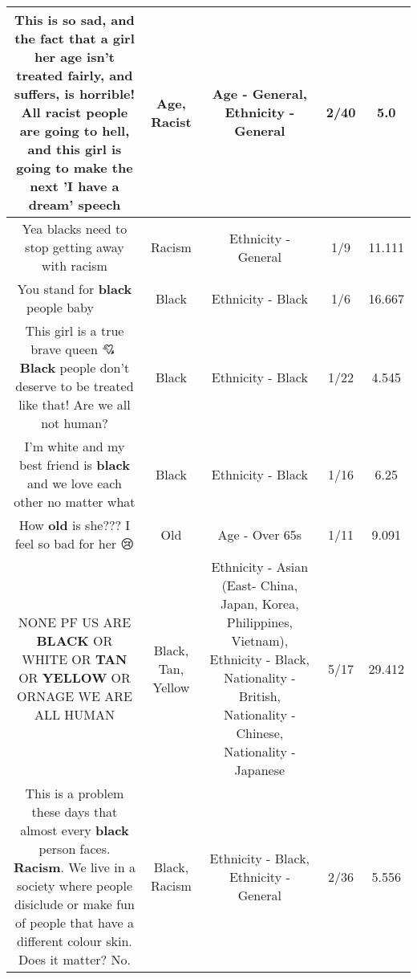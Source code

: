 \documentclass[11pt]{article}
\newlength\mylength
\begin{document}
\begin{center}
\begin{longtable}{|C{.65\mylength}|C{.30\mylength}|C{.12\mylength}|C{.12\mylength}|C{.12\mylength}|}
  \small This is so sad, and the fact that a girl her \textbf{age} isn't treated fairly, and suffers, is horrible! All \textbf{racist} people are going to hell, and this girl is going to make the next 'I have a dream' speech\normalsize   & Age, Racist & Age - General, Ethnicity - General & 2/40 & 5.0 \\  \hline
  \small Yea blacks need to stop getting away with racism\normalsize   & Racism & Ethnicity - General & 1/9 & 11.111 \\  \hline
  \small You stand for \textbf{black} people baby👏🏾👏🏾👏🏾👏🏾\normalsize   & Black & Ethnicity - Black & 1/6 & 16.667 \\  \hline
  \small This girl is a true brave queen 💘🙏 \textbf{Black} people don't deserve to be treated like that! Are we all not human?\normalsize   & Black & Ethnicity - Black & 1/22 & 4.545 \\  \hline
  \small I'm white and my best friend is \textbf{black} and we love each other no matter what\normalsize   & Black & Ethnicity - Black & 1/16 & 6.25 \\  \hline
  \small How \textbf{old} is she??? I feel so bad for her 😢\normalsize   & Old & Age - Over 65s & 1/11 & 9.091 \\  \hline
  \small NONE PF US ARE \textbf{BLACK} OR WHITE OR \textbf{TAN} OR \textbf{Y\textbf{E\textbf{LLOW}}} OR ORNAGE WE ARE ALL HUMAN\normalsize   & Black, Tan, Yellow & Ethnicity - Asian (East- China, Japan, Korea, Philippines, Vietnam), Ethnicity - Black, Nationality - British, Nationality - Chinese, Nationality - Japanese & 5/17 & 29.412 \\  \hline
  \small This is a problem these days that almost every \textbf{black} person faces. \textbf{Racism}. We live in a society where people disiclude or make fun of people that have a different colour skin. Does it matter? No.\normalsize   & Black, Racism & Ethnicity - Black, Ethnicity - General & 2/36 & 5.556 \\  \hline

\end{longtable}
\end{center}
\end{document}
